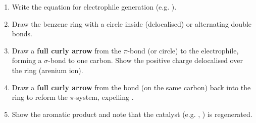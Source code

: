 \documentclass[11pt]{article}
\begin{document}
\begin{methode}
\begin{enumerate}
\item Write the equation for electrophile generation (e.g. ).
\item Draw the benzene ring with a circle inside (delocalised) or alternating double bonds.
\item Draw a \textbf{full curly arrow} from the $\pi$-bond (or circle) to the electrophile, forming a $\sigma$-bond to one carbon. Show the positive charge delocalised over the ring (arenium ion).
\item Draw a \textbf{full curly arrow} from the  bond (on the same carbon) back into the ring to reform the $\pi$-system, expelling .
\item Show the aromatic product and note that the catalyst (e.g. , ) is regenerated.
\end{enumerate}
\end{methode}
\end{document}
